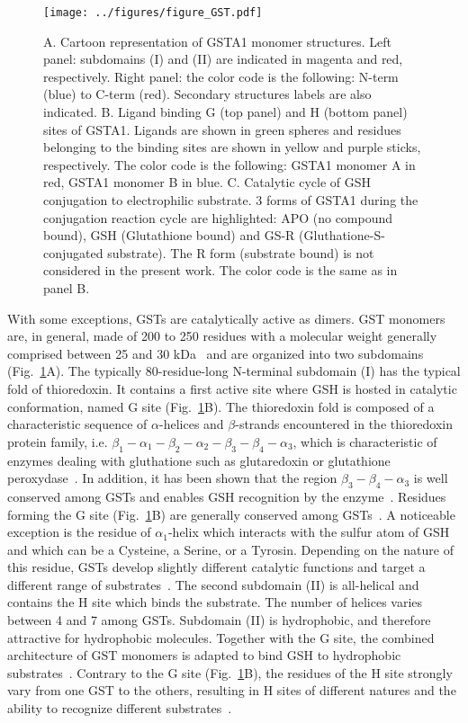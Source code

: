  \begin{figure}[b!]
	\texttt{[image: ../figures/figure\_GST.pdf]}
	\caption{A. Cartoon representation of GSTA1 monomer structures. Left panel: subdomains (I) and (II) are indicated in magenta and red, respectively. Right panel: the color code is the following: N-term (blue) to C-term (red). Secondary structures labels are also indicated. B. Ligand binding G (top panel) and H (bottom panel) sites of GSTA1. Ligands are shown in green spheres and residues belonging to the binding sites are shown in yellow and purple sticks, respectively. The color code is the following: GSTA1 monomer A in red, GSTA1 monomer B in blue. C. Catalytic cycle of GSH conjugation to electrophilic substrate. 3 forms of GSTA1 during the conjugation reaction cycle are highlighted: APO (no compound bound), GSH (Glutathione bound) and GS-R (Gluthatione-S-conjugated substrate). The R form (substrate bound) is not considered in the present work. The color code is the same as in panel B.}
	\label{FIG2}
\end{figure}

With some exceptions, GSTs are catalytically active as dimers. GST monomers are, in general, made of 200 to 250 residues with a molecular weight generally comprised between 25 and 30 kDa~\cite{frova_glutathione_2006,board_glutathione_2013} and are organized into two subdomains (Fig.~\ref{FIG2}A). The typically 80-residue-long N-terminal subdomain (I) has the typical fold of thioredoxin. It contains a first active site where GSH is hosted in catalytic conformation, named G site (Fig.~\ref{FIG2}B). The thioredoxin fold is composed of a characteristic sequence of $\alpha$-helices and $\beta$-strands encountered in the thioredoxin protein family, i.e. $\beta_1-\alpha_1-\beta_2-\alpha_2-\beta_3-\beta_4-\alpha_3$, which is characteristic of enzymes dealing with gluthatione such as glutaredoxin or glutathione peroxydase~\cite{atkinson_atlas_2009}. In addition, it has been shown that the region $\beta_3-\beta_4-\alpha_3$ is well conserved among GSTs and enables GSH recognition by the enzyme~\cite{armstrong_structure_1997}. Residues forming the G site (Fig.~\ref{FIG2}B) are generally conserved among GSTs~\cite{board_glutathione_2013}. A noticeable exception is the residue of $\alpha_1$-helix which interacts with the sulfur atom of GSH and which can be a Cysteine, a Serine, or a Tyrosin. Depending on the nature of this residue, GSTs develop slightly different catalytic functions and target a different range of substrates~\cite{deponte_glutathione_2013}. The second subdomain (II) is all-helical and contains the H site which binds the substrate. The number of helices varies between 4 and 7 among GSTs. Subdomain (II) is hydrophobic, and therefore attractive for hydrophobic molecules. Together with the G site, the combined architecture of GST monomers is adapted to bind GSH to hydrophobic substrates~\cite{mannervik_glutathione_1988}. Contrary to the G site (Fig.~\ref{FIG2}B), the residues of the H site strongly vary from one GST to the others, resulting in H sites of different natures and the ability to recognize different substrates~\cite{cummins_multiple_2011}. 

